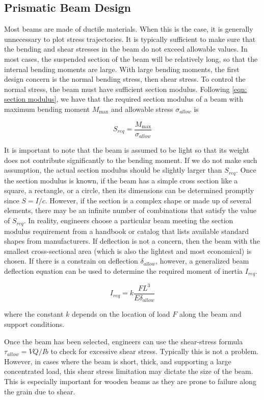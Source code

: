 \documentclass[a4paper,openany,nobib]{tufte-book}
\begin{document}
{{\subsection{Prismatic Beam Design}
\label{prismatic-beam-design}
Most beams are made of ductile materials. When this is the case, it is
generally unnecessary to plot stress trajectories. It is typically
sufficient to make sure that the bending and shear stresses in the beam
do not exceed allowable values. In most cases, the suspended section of
the beam will be relatively long, so that the internal bending moments
are large. With large bending moments, the first design concern is the
normal bending stress, then shear stress. To control the normal stress,
the beam must have sufficient section modulus. Following
\ref{eqn: section modulus}, we have that the
required section modulus of a beam with maximum bending moment
\(M_{\max}\) and allowable stress \(\sigma_{allow}\) is

$$S_{req} = \frac{M_{\max}}{\sigma_{allow}}$$

It is important to note that the beam is assumed to be light so that its
weight does not contribute significantly to the bending moment. If we do
not make such assumption, the actual section modulus should be slightly
larger than \(S_{req}\). Once the section modulus is known, if the beam
has a simple cross section like a square, a rectangle, or a circle, then
its dimensions can be determined promptly since \(S = I/c\). However, if
the section is a complex shape or made up of several elements, there may
be an infinite number of combinations that satisfy the value of
\(S_{req}\). In reality, engineers choose a particular beam meeting the
section modulus requirement from a handbook or catalog that lists
available standard shapes from manufacturers. If deflection is not a
concern, then the beam with the smallest cross-sectional area (which is
also the lightest and most economical) is chosen. If there is a
constrain on deflection \(\delta_{allow}\), however, a generalized beam
deflection equation can be used to determine the required moment of
inertia \(I_{req}\).

$$I_{req} = k \frac{FL^3}{E \delta_{allow}}$$

where the constant \(k\) depends on the location of load \(F\) along the
beam and support conditions.

Once the beam has been selected, engineers can use the shear-stress
formula \(\tau_{allow} = VQ/Ib\) to check for excessive shear stress.
Typically this is not a problem. However, in cases where the beam is
short, thick, and supporting a large concentrated load, this shear
stress limitation may dictate the size of the beam. This is especially
important for wooden beams as they are prone to failure along the grain
due to shear.

}}
\end{document}
